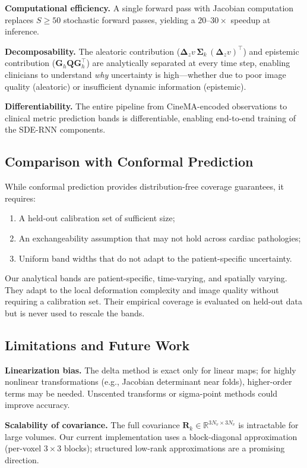 \documentclass[10pt,twocolumn]{article}
\newcommand{\R}{\mathbb{R}}
\begin{document}
\textbf{Computational efficiency.} A single forward pass with Jacobian computation replaces $S \geq 50$ stochastic forward passes, yielding a $20\text{--}30\times$ speedup at inference.

\textbf{Decomposability.} The aleatoric contribution ($\bm{\Delta}_z v \, \bm{\Sigma}_k \, (\bm{\Delta}_z v)^\top$) and epistemic contribution ($\bm{G}_h\bm{Q}\bm{G}_h^\top$) are analytically separated at every time step, enabling clinicians to understand \emph{why} uncertainty is high---whether due to poor image quality (aleatoric) or insufficient dynamic information (epistemic).

\textbf{Differentiability.} The entire pipeline from CineMA-encoded observations to clinical metric prediction bands is differentiable, enabling end-to-end training of the SDE-RNN components.

\subsection{Comparison with Conformal Prediction}

While conformal prediction provides distribution-free coverage guarantees, it requires:
\begin{enumerate}
    \item A held-out calibration set of sufficient size;
    \item An exchangeability assumption that may not hold across cardiac pathologies;
    \item Uniform band widths that do not adapt to the patient-specific uncertainty.
\end{enumerate}

Our analytical bands are patient-specific, time-varying, and spatially varying. They adapt to the local deformation complexity and image quality without requiring a calibration set. Their empirical coverage is evaluated on held-out data but is never used to rescale the bands.

\subsection{Limitations and Future Work}

\textbf{Linearization bias.} The delta method is exact only for linear maps; for highly nonlinear transformations (e.g., Jacobian determinant near folds), higher-order terms may be needed. Unscented transforms or sigma-point methods could improve accuracy.

\textbf{Scalability of covariance.} The full covariance $\bm{R}_k \in \R^{3N_v \times 3N_v}$ is intractable for large volumes. Our current implementation uses a block-diagonal approximation (per-voxel $3 \times 3$ blocks); structured low-rank approximations are a promising direction.
\end{document}
